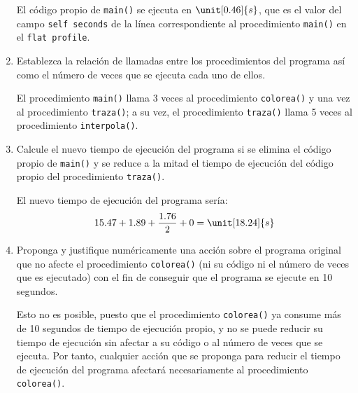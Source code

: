 \begin{ejercicio}
\begin{enumerate}
        El código propio de \verb|main()| se ejecuta en $\unit[0.46]{s}$, que es el valor del campo \verb|self seconds| de la línea correspondiente al procedimiento \verb|main()| en el \verb|flat profile|.
        \item Establezca la relación de llamadas entre los procedimientos del programa así como el número de veces que se ejecuta cada uno de ellos.

        El procedimiento \verb|main()| llama 3 veces al procedimiento \verb|colorea()| y una vez al procedimiento \verb|traza()|; a su vez, el procedimiento \verb|traza()| llama 5 veces al procedimiento \verb|interpola()|.
        \item Calcule el nuevo tiempo de ejecución del programa si se elimina el código propio de \verb|main()| y se reduce a la mitad el tiempo de ejecución del código propio del procedimiento \verb|traza()|.
        
        El nuevo tiempo de ejecución del programa sería:
        \begin{align*}
            15.47 + 1.89 + \frac{1.76}{2} + 0 = \unit[18.24]{s}
        \end{align*}
        \item Proponga y justifique numéricamente una acción sobre el programa original que no afecte el procedimiento \verb|colorea()| (ni su código ni el número de veces que es ejecutado) con el fin de conseguir que el programa se ejecute en 10 segundos.

        Esto no es posible, puesto que el procedimiento \verb|colorea()| ya consume más de 10 segundos de tiempo de ejecución propio, y no se puede reducir su tiempo de ejecución sin afectar a su código o al número de veces que se ejecuta. Por tanto, cualquier acción que se proponga para reducir el tiempo de ejecución del programa afectará necesariamente al procedimiento \verb|colorea()|.
    \end{enumerate}
\end{ejercicio}
\begin{comment}
    Solución:
    \begin{enumerate}
        \item El programa se ejecuta en 19,58 s.
        \item El código propio de \verb|main()| se ejecuta en 0,46 s.
        \item El procedimiento \verb|main()| llama 3 veces a \verb|colorea()| y una vez a \verb|traza()|; a su vez, \verb|traza()| llama 5 veces a \verb|interpola()|.
        \item El tiempo de ejecución sería de 18,24 s.
        \item El tiempo de ejecución no se puede reducir a 10 segundos sin afectar el procedimiento \verb|colorea()| porque su contribución ya sobrepasa este valor. 
    \end{enumerate}
\end{comment}